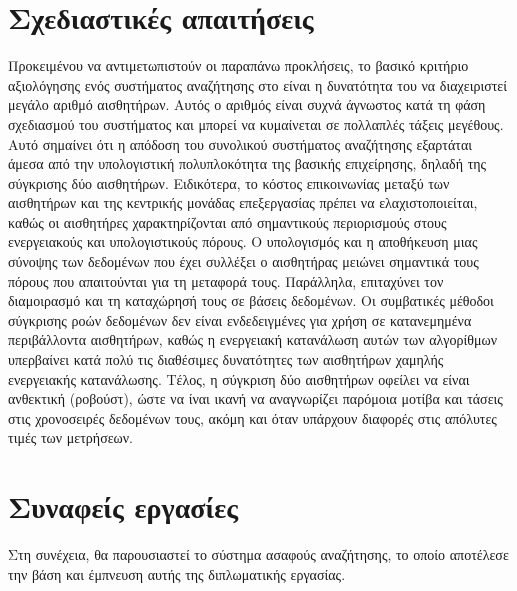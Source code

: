 \section{Σχεδιαστικές απαιτήσεις}
Προκειμένου να αντιμετωπιστούν οι παραπάνω προκλήσεις, το βασικό κριτήριο αξιολόγησης ενός συστήματος αναζήτησης στο  είναι η δυνατότητα του να διαχειριστεί μεγάλο αριθμό αισθητήρων.
Αυτός ο αριθμός είναι συχνά άγνωστος κατά τη φάση σχεδιασμού του συστήματος και μπορεί να κυμαίνεται σε πολλαπλές τάξεις μεγέθους.
Αυτό σημαίνει ότι η απόδοση του συνολικού συστήματος αναζήτησης εξαρτάται άμεσα από την υπολογιστική πολυπλοκότητα της βασικής επιχείρησης, δηλαδή της σύγκρισης δύο αισθητήρων.
Ειδικότερα, το κόστος επικοινωνίας μεταξύ των αισθητήρων και της κεντρικής μονάδας επεξεργασίας πρέπει να ελαχιστοποιείται, καθώς οι αισθητήρες χαρακτηρίζονται από σημαντικούς περιορισμούς στους ενεργειακούς και υπολογιστικούς πόρους.
Ο υπολογισμός και η αποθήκευση μιας σύνοψης των δεδομένων που έχει συλλέξει ο αισθητήρας μειώνει σημαντικά τους πόρους που απαιτούνται για τη μεταφορά τους. Παράλληλα, επιταχύνει τον διαμοιρασμό και τη καταχώρησή τους σε βάσεις δεδομένων.
Οι συμβατικές μέθοδοι σύγκρισης ροών δεδομένων δεν είναι ενδεδειγμένες για χρήση σε κατανεμημένα περιβάλλοντα αισθητήρων, καθώς η ενεργειακή κατανάλωση αυτών των αλγορίθμων υπερβαίνει κατά πολύ τις διαθέσιμες δυνατότητες των αισθητήρων χαμηλής ενεργειακής κατανάλωσης.
Τέλος, η σύγκριση δύο αισθητήρων οφείλει να είναι ανθεκτική (ροβούστ), ώστε να ίναι ικανή να αναγνωρίζει παρόμοια μοτίβα και τάσεις στις χρονοσειρές δεδομένων τους, ακόμη και όταν υπάρχουν διαφορές στις απόλυτες τιμές των μετρήσεων.
\section{Συναφείς εργασίες} \label{Related works}
Στη συνέχεια, θα παρουσιαστεί το σύστημα ασαφούς αναζήτησης\cite{Truong2012}\cite{Truong2013}, το οποίο αποτέλεσε την βάση και έμπνευση αυτής της διπλωματικής εργασίας.
\par

